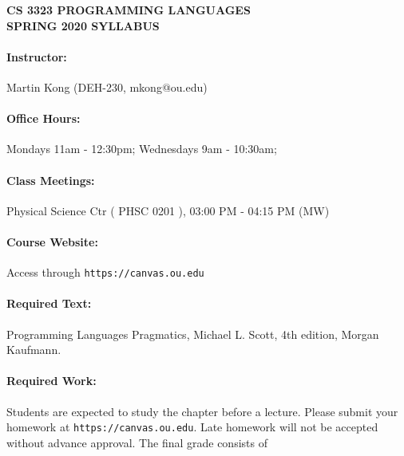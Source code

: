 \documentclass[11pt, epsfig]{article}
\begin{document}
\begin{center}
{\Large\bf CS 3323 PROGRAMMING LANGUAGES\\
  SPRING 2020 SYLLABUS}
\end{center}

\paragraph{Instructor:} Martin Kong (DEH-230,  mkong@ou.edu)

\paragraph{Office Hours:} Mondays 11am - 12:30pm; Wednesdays 9am - 10:30am;


\paragraph{Class Meetings:} Physical Science Ctr ( PHSC 0201 ),
03:00 PM - 04:15 PM (MW)

\paragraph{Course Website:} Access through \texttt{https://canvas.ou.edu} 


\paragraph{Required Text:} Programming Languages Pragmatics, 
Michael L. Scott, 4th edition, Morgan Kaufmann.


\paragraph{Required Work:}
Students are expected to study the chapter before a lecture.
Please submit your homework at {\tt https://canvas.ou.edu}.
Late homework will not be accepted without advance approval.
The final grade consists of
\end{document}
